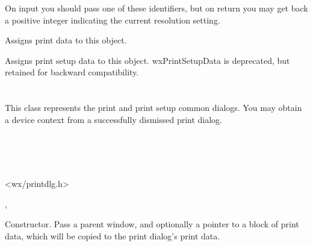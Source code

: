 On input you should pass one of these identifiers, but on return you may get back a positive integer
indicating the current resolution setting.


\label{wxprintdataassign}


Assigns print data to this object.


Assigns print setup data to this object. wxPrintSetupData is deprecated,
but retained for backward compatibility.

\section{}\label{wxprintdialog}

This class represents the print and print setup common dialogs.
You may obtain a  device context from
a successfully dismissed print dialog.


\\
\\
\\


<wx/printdlg.h>


, 



\label{wxprintdialogctor}


Constructor. Pass a parent window, and optionally a pointer to a block of print
data, which will be copied to the print dialog's print data.




\label{wxprintdialogdtor}

